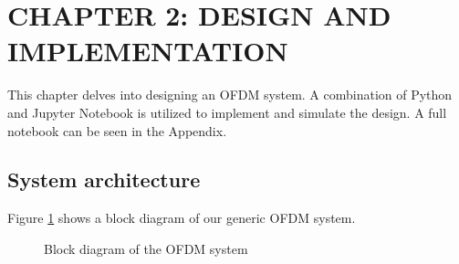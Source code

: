 \section*{CHAPTER 2: DESIGN AND IMPLEMENTATION}
\setcounter{section}{2}
\setcounter{subsection}{0}
\setcounter{figure}{0}
\setcounter{table}{0}

This chapter delves into designing an OFDM system. A combination of Python and Jupyter Notebook is utilized to implement and simulate the design. A full notebook can be seen in the Appendix. 

\subsection{System architecture}
Figure \ref{diagram} shows a block diagram of our generic OFDM system.

\begin{figure}[htbp]
    \centering
    
    \caption{Block diagram of the OFDM system}
    \label{diagram}
\end{figure}

